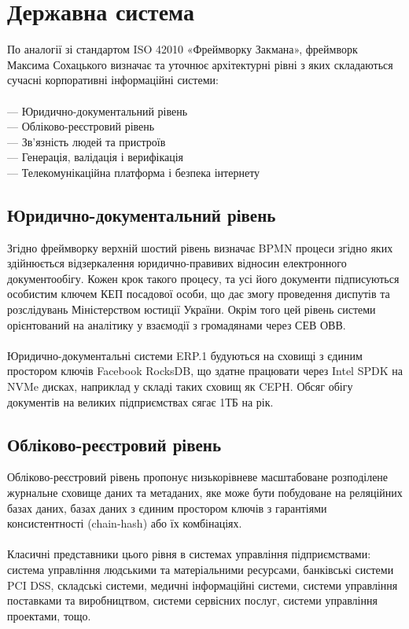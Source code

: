 \chapter{Державна система}

По аналогії зі стандартом ISO 42010 «Фреймворку Закмана»,
фреймворк Максима Сохацького визначає та уточнює архітектурні рівні
з яких складаються сучасні корпоративні інформаційні системи:
\\
\\
--- Юридично-документальний рівень \\
--- Обліково-реєстровий рівень \\
--- Зв'язність людей та пристроїв \\
--- Генерація, валідація і верифікація \\
--- Телекомунікаційна платформа і безпека інтернету\\

\section{Юридично-документальний рівень}

Згідно фреймворку верхній шостий рівень визначає BPMN процеси згідно яких здійнюється
відзеркалення юридично-правивих відносин електронного документообігу. Кожен крок такого
процесу, та усі його документи підписуються особистим ключем КЕП посадової особи, що дає
змогу проведення диспутів та розслідувань Міністерством юстиції України. Окрім того цей
рівень системи орієнтований на аналітику у взаємодії з громадянами через СЕВ ОВВ.
\\
\\
Юридично-документальні системи ERP.1 будуються на сховищі з єдиним
простором ключів Facebook RocksDB, що здатне працювати через Intel SPDK на NVMe
дисках, наприклад у складі таких сховищ як CEPH. Обсяг обігу документів на великих
підприємствах сягає 1ТБ на рік.

\newpage
\section{Обліково-реєстровий рівень}

Обліково-реєстровий рівень пропонує низькорівневе масштабоване розподілене
журнальне сховище даних та метаданих, яке може бути побудоване на реляційних
базах даних, базах даних з єдиним простором ключів з гарантіями
консистентності (chain-hash) або їх комбінаціях.
\\
\\
Класичні представники цього рівня в системах управління підприємствами: система
управління людськими та матеріальними ресурсами, банківські системи PCI DSS,
складські системи, медичні інформаційні системи, системи управління поставками
та виробництвом, системи сервісних послуг, системи управління проектами, тощо.


